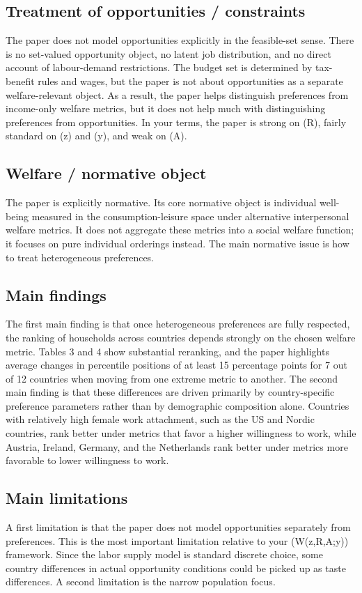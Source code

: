 \documentclass[11pt,a4paper]{article}
\begin{document}
\subsection*{Treatment of opportunities / constraints}
The paper does not model opportunities explicitly in the feasible-set sense. There is no set-valued opportunity object, no latent job distribution, and no direct account of labour-demand restrictions. The budget set is determined by tax-benefit rules and wages, but the paper is not about opportunities as a separate welfare-relevant object. As a result, the paper helps distinguish preferences from income-only welfare metrics, but it does not help much with distinguishing preferences from opportunities. In your terms, the paper is strong on (R), fairly standard on (z) and (y), and weak on (A).

\subsection*{Welfare / normative object}
The paper is explicitly normative. Its core normative object is individual well-being measured in the consumption-leisure space under alternative interpersonal welfare metrics. It does not aggregate these metrics into a social welfare function; it focuses on pure individual orderings instead. The main normative issue is how to treat heterogeneous preferences.

\subsection*{Main findings}
The first main finding is that once heterogeneous preferences are fully respected, the ranking of households across countries depends strongly on the chosen welfare metric. Tables 3 and 4 show substantial reranking, and the paper highlights average changes in percentile positions of at least 15 percentage points for 7 out of 12 countries when moving from one extreme metric to another. The second main finding is that these differences are driven primarily by country-specific preference parameters rather than by demographic composition alone. Countries with relatively high female work attachment, such as the US and Nordic countries, rank better under metrics that favor a higher willingness to work, while Austria, Ireland, Germany, and the Netherlands rank better under metrics more favorable to lower willingness to work.

\subsection*{Main limitations}
A first limitation is that the paper does not model opportunities separately from preferences. This is the most important limitation relative to your (W(z,R,A;y)) framework. Since the labor supply model is standard discrete choice, some country differences in actual opportunity conditions could be picked up as taste differences. A second limitation is the narrow population focus.
\end{document}
